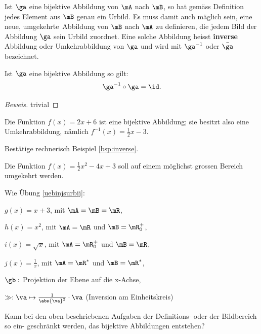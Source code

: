 \documentclass[%
11pt,%
twoside,%
titlepage,%
german,%
headsepline%
]{scrartcl}
\begin{document}
Ist $\ga$ eine bijektive Abbildung von $\mA$ nach $\mB$, so hat gemäss Definition jedes Element aus $\mB$ genau ein Urbild. Es muss damit auch mäglich sein, eine neue, \glqq umgekehrte\grqq\ Abbildung von $\mB$ nach $\mA$ zu definieren, die jedem Bild der Abbildung $\ga$ sein Urbild zuordnet. Eine solche Abbildung heisst \textbf{inverse} Abbildung oder Umkehrabbildung von $\ga$ und wird mit $\ga^{-1}$ oder $\bar{\ga}$ bezeichnet.

\begin{satz}
Ist $\ga$ eine bijektive Abbildung so gilt:
$$\ga^{-1}\circ\ga=\id.$$
\end{satz}

\begin{proof}[Beweis]
trivial
\end{proof}

\begin{bsp}
\label{bsp:inverse}
Die Funktion $f(x) = 2x + 6$ ist eine bijektive Abbildung; sie besitzt also eine
Umkehrabbildung, nämlich $f^{-1}(x)=\frac{1}{2}x-3$.
\end{bsp}

\begin{ueb}
Bestätige rechnerisch Beispiel \ref{bsp:inverse}.
\end{ueb}

\begin{ueb}
Die Funktion $f(x) = \frac{1}{2}x^2-4x+3$ soll auf einem möglichst grossen Bereich umgekehrt werden.
\end{ueb}

\begin{ueb}
Wie Übung \ref{uebinjsurbij}:

\begin{enumeratea}
\addtocounter{enumi}{2}
\item $g(x)=x+3$, mit $\mA=\mB=\mR$,
\item $h(x)=x^2$, mit $\mA=\mR$ und $\mB=\mR^+_0$,
\item $i(x)=\sqrt{x}$, mit $\mA=\mR^+_0$ und $\mB=\mR$,
\item $j(x)=\frac{1}{x}$, mit $\mA=\mR^*$ und $\mB=\mR^*$,
\item $\gb:$ Projektion der Ebene auf die x-Achse,
\item $\gg:\va\mapsto\frac{1}{\abs{\va}^2}\cdot\va$ (Inversion am Einheitskreis)
\end{enumeratea}
\end{ueb}

\begin{ueb}
Kann bei den oben beschriebenen Aufgaben der Definitions- oder der Bildbereich so ein- geschränkt werden, das bijektive Abbildungen entstehen?
\end{ueb}
\end{document}

